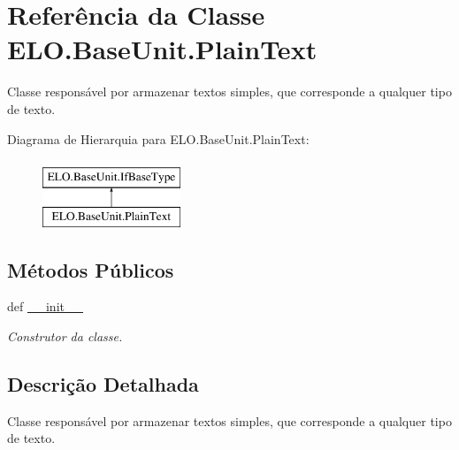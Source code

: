 \hypertarget{classELO_1_1BaseUnit_1_1PlainText}{\section{Referência da Classe E\-L\-O.\-Base\-Unit.\-Plain\-Text}
\label{classELO_1_1BaseUnit_1_1PlainText}
}


Classe responsável por armazenar textos simples, que corresponde a qualquer tipo de texto.  


Diagrama de Hierarquia para E\-L\-O.\-Base\-Unit.\-Plain\-Text\-:\begin{figure}[H]
\begin{center}
\leavevmode
\includegraphics[height=2.000000cm]{d4/d2d/classELO_1_1BaseUnit_1_1PlainText}
\end{center}
\end{figure}
\subsection*{Métodos Públicos}
\begin{DoxyCompactItemize}
\item 
def \hyperlink{classELO_1_1BaseUnit_1_1PlainText_a2cd4f19585b5e8e8279f8052307d031f}{\-\_\-\-\_\-init\-\_\-\-\_\-}
\begin{DoxyCompactList}\small\item\em Construtor da classe. \end{DoxyCompactList}\end{DoxyCompactItemize}


\subsection{Descrição Detalhada}
Classe responsável por armazenar textos simples, que corresponde a qualquer tipo de texto. 



